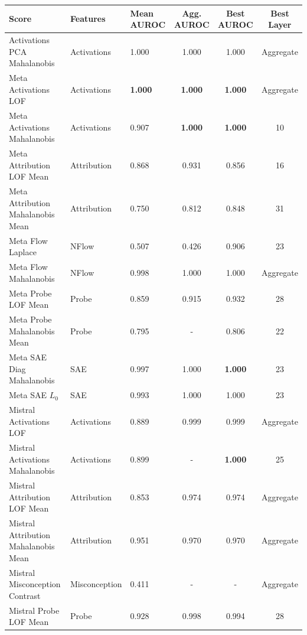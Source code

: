 \begin{table}[H]
\centering
\scriptsize  %
\renewcommand{\arraystretch}{1.2}  %
\setlength{\tabcolsep}{2pt}  %
\begin{tabular}{lp{3cm}lccc}
\toprule
\textbf{Score} & \textbf{Features} & \textbf{Mean AUROC} & \textbf{Agg. AUROC} & \textbf{Best AUROC} & \textbf{Best Layer} \\
\midrule
Activations PCA Mahalanobis       & Activations & 1.000  & 1.000  & 1.000  & Aggregate \\ 
Meta Activations LOF              & Activations & \textbf{1.000}  & \textbf{1.000}  & \textbf{1.000}  & Aggregate \\ 
Meta Activations Mahalanobis      & Activations & 0.907  & \textbf{1.000}  & \textbf{1.000}  & 10 \\ 
Meta Attribution LOF Mean         & Attribution & 0.868  & 0.931  & 0.856  & 16 \\ 
Meta Attribution Mahalanobis Mean & Attribution & 0.750  & 0.812  & 0.848  & 31 \\ 
Meta Flow Laplace                 & NFlow       & 0.507  & 0.426  & 0.906  & 23 \\ 
Meta Flow Mahalanobis             & NFlow       & 0.998  & 1.000  & 1.000  & Aggregate \\ 
Meta Probe LOF Mean               & Probe       & 0.859  & 0.915  & 0.932  & 28 \\ 
Meta Probe Mahalanobis Mean       & Probe       & 0.795  & -  & 0.806  & 22 \\ 
Meta SAE Diag Mahalanobis         & SAE         & 0.997  & 1.000  & \textbf{1.000}  & 23 \\ 
Meta SAE $L_0$                    & SAE         & 0.993  & 1.000  & 1.000  & 23 \\ 
Mistral Activations LOF           & Activations & 0.889  & 0.999  & 0.999  & Aggregate \\ 
Mistral Activations Mahalanobis   & Activations & 0.899  & -  & \textbf{1.000}  & 25 \\ 
Mistral Attribution LOF Mean      & Attribution & 0.853  & 0.974  & 0.974  & Aggregate \\ 
Mistral Attribution Mahalanobis Mean & Attribution & 0.951  & 0.970  & 0.970  & Aggregate \\ 
Mistral Misconception Contrast    & Misconception & 0.411  & -  & -  & Aggregate \\ 
Mistral Probe LOF Mean            & Probe       & 0.928  & 0.998  & 0.994  & 28 \\ 

\end{tabular}
\end{table}
